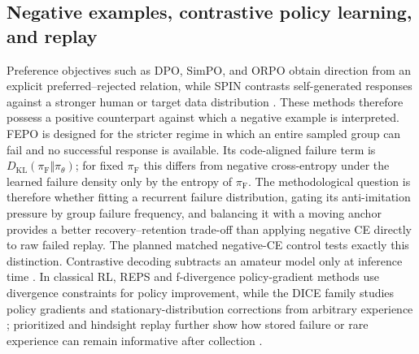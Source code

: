 \documentclass{article}
\newcommand{\pol}{\pi_\theta}
\newcommand{\failpol}{\pi_{\mathrm F}}
\newcommand{\KL}{D_{\mathrm{KL}}}
\newcommand{\FEPO}{\textsc{FEPO}\xspace}
\begin{document}
\subsection{Negative examples, contrastive policy learning, and replay}
Preference objectives such as DPO, SimPO, and ORPO obtain direction from an explicit preferred--rejected relation, while SPIN contrasts self-generated responses against a stronger human or target data distribution \citep{rafailov2023dpo,meng2024simpo,hong2024orpo,chen2024spin}. These methods therefore possess a positive counterpart against which a negative example is interpreted. \FEPO is designed for the stricter regime in which an entire sampled group can fail and no successful response is available. Its code-aligned failure term is $\KL(\failpol\Vert\pol)$; for fixed $\failpol$ this differs from negative cross-entropy under the learned failure density only by the entropy of $\failpol$. The methodological question is therefore whether fitting a recurrent failure distribution, gating its anti-imitation pressure by group failure frequency, and balancing it with a moving anchor provides a better recovery--retention trade-off than applying negative CE directly to raw failed replay. The planned matched negative-CE control tests exactly this distinction. Contrastive decoding subtracts an amateur model only at inference time \citep{li2022contrastive}. In classical RL, REPS and f-divergence policy-gradient methods use divergence constraints for policy improvement, while the DICE family studies policy gradients and stationary-distribution corrections from arbitrary experience \citep{peters2010reps,nachum2017fdpg,nachum2019dualdice,nachum2019algaedice,zhang2020gendice,yang2020bestdice}; prioritized and hindsight replay further show how stored failure or rare experience can remain informative after collection \citep{schaul2016per,andrychowicz2017her}.
\end{document}
